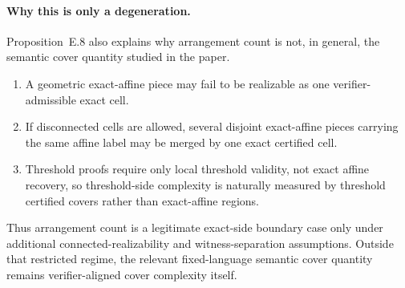 \paragraph{Why this is only a degeneration.}
Proposition~E.8 also explains why arrangement count is not, in general, the semantic cover quantity studied in the paper.
\begin{enumerate}
    \item A geometric exact-affine piece may fail to be realizable as one verifier-admissible exact cell.
    \item If disconnected cells are allowed, several disjoint exact-affine pieces carrying the same affine label may be merged by one exact certified cell.
    \item Threshold proofs require only local threshold validity, not exact affine recovery, so threshold-side complexity is naturally measured by threshold certified covers rather than exact-affine regions.
\end{enumerate}
Thus arrangement count is a legitimate exact-side boundary case only under additional connected-realizability and witness-separation assumptions. Outside that restricted regime, the relevant fixed-language semantic cover quantity remains verifier-aligned cover complexity itself.
